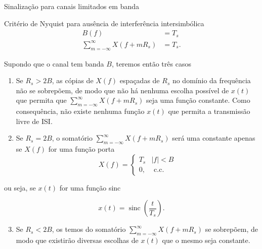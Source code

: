 \documentclass[
  ignorenonframetext,
]{beamer}
\providecommand{\tightlist}{%
  \setlength{\itemsep}{0pt}\setlength{\parskip}{0pt}}
\begin{document}
\begin{frame}{Sinalização para canais limitados em banda}
\begin{block}{Critério de Nyquist para ausência de interferência
intersimbólica}
\[
\begin{align}
B(f)&=T_s\\
\sum_{m=-\infty}^{\infty} X(f+m R_s)&=T_s.
\end{align}
\]

Supondo que o canal tem banda \(B\), teremos então três casos

\begin{enumerate}
\item
  Se \(R_s > 2B\), as cópias de \(X(f)\) espaçadas de \(R_s\) no domínio
  da frequência não se sobrepõem, de modo que não há nenhuma escolha
  possível de \(x(t)\) que permita que
  \(\sum_{m=-\infty}^{\infty} X(f+m R_s)\) seja uma função constante.
  Como consequência, não existe nenhuma função \(x(t)\) que permita a
  transmissão livre de ISI.
\item
  Se \(R_s = 2B\), o somatório \(\sum_{m=-\infty}^{\infty} X(f+m R_s)\)
  será uma constante apenas se \(X(f)\) for uma função porta \begin{equation}
  X(f)= \begin{cases}T_s & |f|<B \\ 0, & \text { c.c. }\end{cases}
  \end{equation}
\end{enumerate}

ou seja, se \(x(t)\) for uma função sinc

\begin{equation}
x(t)=\operatorname{sinc}\left(\frac{t}{T_s}\right).
\end{equation}

\begin{enumerate}
\setcounter{enumi}{2}
\tightlist
\item
  Se \(R_s < 2B\), os temos do somatório
  \(\sum_{m=-\infty}^{\infty} X(f+m R_s)\) se sobrepõem, de modo que
  existirão diversas escolhas de \(x(t)\) que o mesmo seja constante.
\end{enumerate}
\end{block}


\end{frame}
\end{document}
